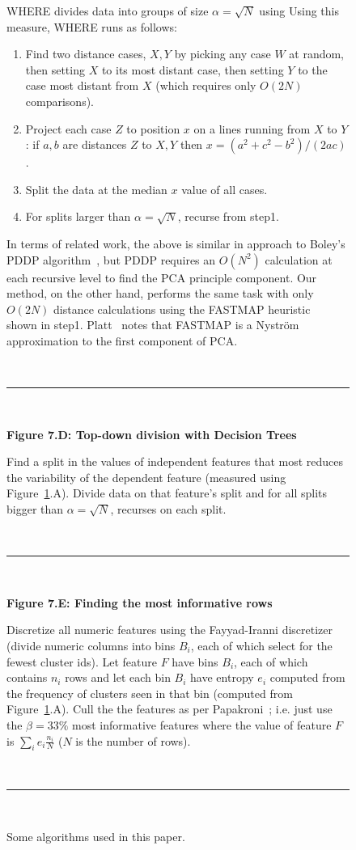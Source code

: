 \documentclass{sig-alternate}
\newcommand{\fig}[1]{Figure~\ref{fig:#1}}
\begin{document}
\begin{figure}
\begin{shaded}
				WHERE  divides data into  groups of size $\alpha=\sqrt{N}$ using 
		Using this measure, WHERE runs as follows:
		\begin{enumerate}[leftmargin=3mm]
			\item Find   two   distance cases,  $X,Y$
			by picking any case $W$ at random, then setting $X$ to its most
			distant case, then setting $Y$ to the case most distant from
			$X$
			(which requires only $O(2N)$ comparisons).
			\item Project each case $Z$
			to position $x$ on a    lines running from $X$ to $Y$: if $a,b$  are distances  $Z$ to $X,Y$  then  $x = (a^2+c^2 - b^2)/(2ac)$.
			\item Split the data at the median $x$ value of all cases.
			\item For   splits larger than  $\alpha=\sqrt{N}$, recurse   from step1.
		\end{enumerate}
 In terms of related work,
	  the above is similar in approach to Boley's PDDP algorithm~\cite{boley98}, but PDDP requires an $O(N^2)$ calculation
	  at each recursive level to find the PCA principle component. Our method, on the other hand,
	  performs the same task with only $O(2N)$ distance calculations 	using the 
	  FASTMAP heuristic~\cite{Faloutsos1995} shown in step1. Platt~\cite{platt05} notes that FASTMAP is a  Nystr\"om approximation to the first component of PCA.  
	  
	   ~\hrule~
	   
	{\bf Figure 7.D: Top-down division with Decision Trees}
	
	Find a split in the values of  independent features that most reduces the variability
  of the dependent feature (measured using \fig{where}.A). Divide data on that  feature's split and 
   for all splits bigger than $\alpha=\sqrt{N}$,  recurses on each split.
	
	 ~\hrule~
	 
	 	{\bf Figure 7.E: Finding the most informative rows}
	

Discretize all numeric features using the Fayyad-Iranni discretizer~\cite{FayIra93Multi}
(divide numeric columns into bins $B_i$, each of which  select for the fewest cluster ids).
Let feature $F$ have bins $B_i$, each of which contains $n_i$ rows
and 
let each bin $B_i$ have entropy $e_i$ computed from the frequency of clusters seen in that bin (computed from \fig{where}.A).
Cull the the features as per Papakroni~\cite{papa13}; i.e. just use the $\beta=33\%$ most informative features
where  the   value of  feature $F$ is $\sum_i e_i\frac{n_i}{N}$ ($N$ is the number of rows).

~\hrule~ 

	  \end{shaded}
		\caption{Some algorithms used in this paper.}\label{fig:where}
		\end{figure}
 
\end{document}
